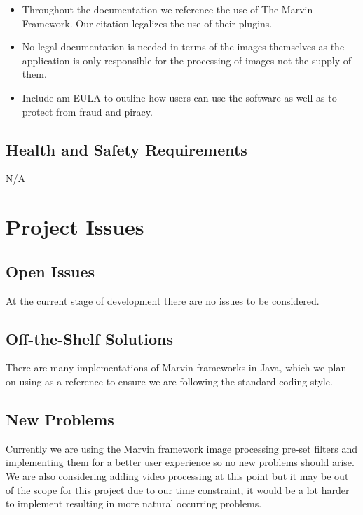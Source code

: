 \documentclass[12pt, titlepage]{article}
\begin{document}
\begin{itemize}
\item Throughout the documentation we reference the use of The Marvin Framework. Our citation legalizes the use of their plugins.
\item No legal documentation is needed in terms of the images themselves as the application is only responsible for the processing of images not the supply of them.
\item Include am EULA to outline how users can use the software as well as to protect from fraud and piracy.
\end{itemize}

\subsection{Health and Safety Requirements}

N/A

\newpage

\section{Project Issues}

\subsection{Open Issues}
At the current stage of development there are no issues to be considered.

\subsection{Off-the-Shelf Solutions}

There are many implementations of Marvin frameworks in Java, which we plan on using as a reference to ensure we are following the standard coding style.

\subsection{New Problems}

Currently we are using the Marvin framework image processing pre-set filters and implementing them for a better user experience so no new problems should arise. We are also considering adding video processing at this point but it may be out of the scope for this project due to our time constraint, it would be a lot harder to implement resulting in more natural occurring problems.
\end{document}
